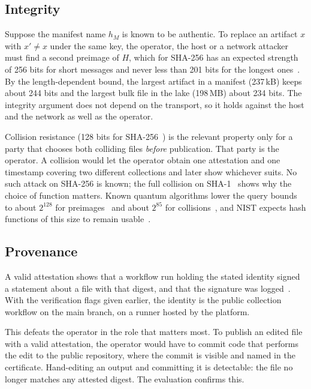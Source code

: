 \subsection{Integrity}

Suppose the manifest name $h_M$ is known to be authentic. To replace an artifact $x$ with $x'\neq x$ under the same key, the operator, the host or a network attacker must find a second preimage of $H$, which for SHA-256 has an expected strength of 256 bits for short messages and never less than 201 bits for the longest ones~\citep{sp800-107r1,kelsey2005second}. By the length-dependent bound, the largest artifact in a manifest (237\,kB) keeps about 244 bits and the largest bulk file in the lake (198\,MB) about 234 bits. The integrity argument does not depend on the transport, so it holds against the host and the network as well as the operator.

Collision resistance (128 bits for SHA-256~\citep{sp800-107r1,rogaway2004hash}) is the relevant property only for a party that chooses both colliding files \emph{before} publication. That party is the operator. A collision would let the operator obtain one attestation and one timestamp covering two different collections and later show whichever suits. No such attack on SHA-256 is known; the full collision on SHA-1~\citep{stevens2017sha1} shows why the choice of function matters. Known quantum algorithms lower the query bounds to about $2^{128}$ for preimages~\citep{grover1996search} and about $2^{85}$ for collisions~\citep{brassard1998quantum}, and NIST expects hash functions of this size to remain usable~\citep{nistir8105}.

\subsection{Provenance}

A valid attestation shows that a workflow run holding the stated identity signed a statement about a file with that digest, and that the signature was logged~\citep{github-attestations}. With the verification flags given earlier, the identity is the public collection workflow on the main branch, on a runner hosted by the platform.

This defeats the operator in the role that matters most. To publish an edited file with a valid attestation, the operator would have to commit code that performs the edit to the public repository, where the commit is visible and named in the certificate. Hand-editing an output and committing it is detectable: the file no longer matches any attested digest. The evaluation confirms this.

